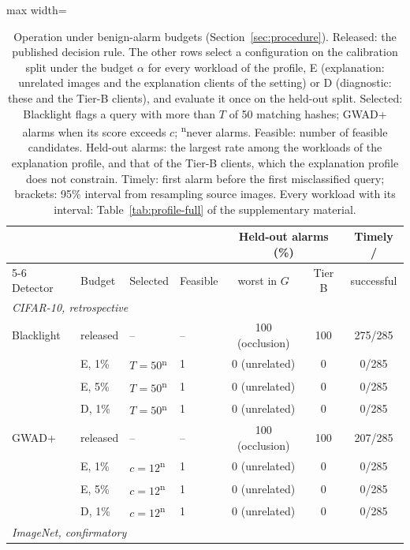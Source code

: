 \begin{table}[!tbp]
\centering\footnotesize\setlength{\tabcolsep}{4pt}
\caption{Operation under benign-alarm budgets (Section~\ref{sec:procedure}). Released: the published decision rule. The other rows select a configuration on the calibration split under the budget $\alpha$ for every workload of the profile, E (explanation: unrelated images and the explanation clients of the setting) or D (diagnostic: these and the Tier-B clients), and evaluate it once on the held-out split. Selected: Blacklight flags a query with more than $T$ of 50 matching hashes; GWAD+ alarms when its score exceeds $c$; \textsuperscript{n}never alarms. Feasible: number of feasible candidates. Held-out alarms: the largest rate among the workloads of the explanation profile, and that of the Tier-B clients, which the explanation profile does not constrain. Timely: first alarm before the first misclassified query; brackets: 95\% interval from resampling source images. Every workload with its interval: Table~\ref{tab:profile-full} of the supplementary material.}
\label{tab:selection}
\vspace{3pt}
\begin{adjustbox}{max width=\textwidth}
\begin{tabular}{llllccc}
\toprule
& & & & \multicolumn{2}{c}{Held-out alarms (\%)} & Timely / \\
\cmidrule(lr){5-6}
Detector & Budget & Selected & Feasible & worst in $G$ & Tier B & successful \\
\midrule
\multicolumn{7}{l}{\emph{CIFAR-10, retrospective}} \\
Blacklight & released & -- & -- & 100 (occlusion) & 100 & 275/285 \\
 & E, 1\% & $T=50$\textsuperscript{n} & 1 & 0 (unrelated) & 0 & 0/285 \\
 & E, 5\% & $T=50$\textsuperscript{n} & 1 & 0 (unrelated) & 0 & 0/285 \\
 & D, 1\% & $T=50$\textsuperscript{n} & 1 & 0 (unrelated) & 0 & 0/285 \\
GWAD+ & released & -- & -- & 100 (occlusion) & 100 & 207/285 \\
 & E, 1\% & $c=12$\textsuperscript{n} & 1 & 0 (unrelated) & 0 & 0/285 \\
 & E, 5\% & $c=12$\textsuperscript{n} & 1 & 0 (unrelated) & 0 & 0/285 \\
 & D, 1\% & $c=12$\textsuperscript{n} & 1 & 0 (unrelated) & 0 & 0/285 \\
\multicolumn{7}{l}{\emph{ImageNet, confirmatory}} \\

\end{tabular}
\end{adjustbox}
\end{table}

